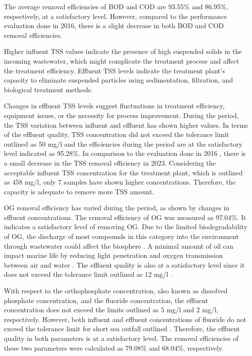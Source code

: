 The average removal efficiencies of \ac{BOD} and \ac{COD} are 93.55\% and 86.95\%, respectively, at a satisfactory level. However, compared to the performance evaluation done in 2016, there is a slight decrease in both \ac{BOD} and \ac{COD} removal efficiencies.

Higher influent \ac{TSS} values indicate the presence of high suspended solids in the incoming wastewater, which might complicate the treatment process and affect the treatment efficiency. Effluent \ac{TSS} levels indicate the treatment plant's capacity to eliminate suspended particles using sedimentation, filtration, and biological treatment methods.

Changes in effluent \ac{TSS} levels suggest fluctuations in treatment efficiency, equipment issues, or the necessity for process improvement. During the period, the \ac{TSS} variation between influent and effluent has shown higher values. In terms of the effluent quality, \ac{TSS} concentration did not exceed the tolerance limit outlined as 50 mg/l \cite{CEA2022} and the efficiencies during the period are at the satisfactory level indicated as 95.28\%. In comparison to the evaluation done in 2016 \cite{Danushika2016}, there is a small decrease in the \ac{TSS} removal efficiency in 2023.  Considering the acceptable influent \ac{TSS} concentration for the treatment plant, which is outlined as 458 mg/l, only 7 samples have shown higher concentrations. Therefore, the capacity is adequate to remove more \ac{TSS} amount.

\ac{OG} removal efficiency has varied during the period, as shown by changes in effluent concentrations. The removal efficiency of \ac{OG} was measured as 97.04\%. It indicates a satisfactory level of removing \ac{OG}. Due to the limited biodegradability of \ac{OG}, the discharge of most compounds in this category into the environment through wastewater could affect the biosphere \cite{Wahi2013}. A minimal amount of oil can impact marine life by reducing light penetration and oxygen transmission between air and water \cite{Roques2011}. The effluent quality is also at a satisfactory level since it does not exceed the tolerance limit outlined as 12 mg/l \cite{CEA2022}. 

With respect to the orthophosphate concentration, also known as dissolved phosphate concentration, and the fluoride concentration, the effluent concentration does not exceed the limits outlined as 5 mg/l and 2 mg/l, respectively. However, both influent and effluent concentrations of fluoride do not exceed the tolerance limit for short sea outfall outlined \cite{CEA2022}. Therefore, the effluent quality in both parameters is at a satisfactory level. The removal efficiencies of these two parameters were calculated as 79.08\% and 68.04\%, respectively.


